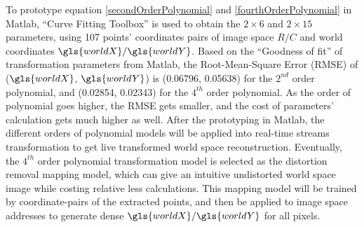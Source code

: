 %
\indent
To prototype equation \ref{secondOrderPolynomial} and \ref{fourthOrderPolynomial} in Matlab, \enquote{Curve Fitting Toolbox} is used to obtain the $2\times6$ and $2\times15$ parameters, using 107 points' coordinates pairs of image space \(R/C\) and world coordinates \(\gls{worldX}/\gls{worldY}\). Based on the \enquote{Goodness of fit} of transformation parameters from Matlab, the Root-Mean-Square Error (RMSE) of (\(\gls{worldX}\), \(\gls{worldY}\)) is (0.06796, 0.05638) for the \(2^{nd}\) order polynomial, and (0.02854, 0.02343) for the \(4^{th}\) order polynomial. As the order of polynomial goes higher, the RMSE gets smaller, and the cost of parameters' calculation gets much higher as well. After the prototyping in Matlab, the different orders of polynomial models will be applied into real-time streams transformation to get live transformed world space reconstruction. Eventually, the \(4^{th}\) order polynomial transformation model is selected as the distortion removal mapping model, which can give an intuitive undistorted world space image while costing relative less calculations. This mapping model will be trained by coordinate-pairs of the extracted points, and then be applied to image space addresses to generate dense \(\gls{worldX}/\gls{worldY}\) for all pixels.
%
%
